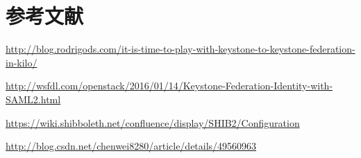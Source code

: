 \section{参考文献}
\url{http://blog.rodrigods.com/it-is-time-to-play-with-keystone-to-keystone-federation-in-kilo/}

\url{http://wsfdl.com/openstack/2016/01/14/Keystone-Federation-Identity-with-SAML2.html}

\url{https://wiki.shibboleth.net/confluence/display/SHIB2/Configuration}

\url{http://blog.csdn.net/chenwei8280/article/details/49560963}
